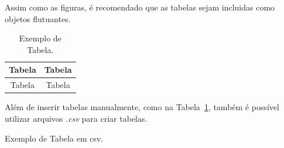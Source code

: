 Assim como as figuras, é recomendado que as tabelas sejam incluidas como
objetos flutuantes.
\begin{table}[!htb]
\caption{Exemplo de Tabela.}
\label{tab:exem}
\centering
\begin{tabular}{c|c}
Tabela & Tabela \\ \hline
Tabela & Tabela \\
\end{tabular}
\end{table}

Além de inserir tabelas manualmente, como na Tabela~\ref{tab:exem}, também é possível utilizar arquivos
\emph{.csv} para criar tabelas.
\begin{table}[!htb]
\caption{Exemplo de Tabela em csv.}
\label{tab:exem_csv}
\centering
{}
\end{table}
